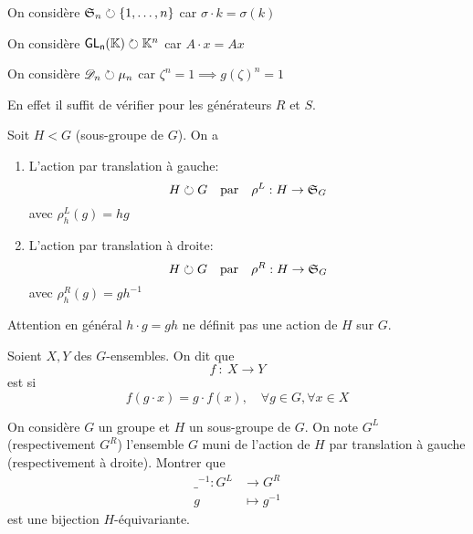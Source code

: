 \begin{example}
    On considère \({\mathfrak{S}}_n \circlearrowright \{1,\ldots,n\}\) car \(\sigma \cdot k = \sigma(k)\)

    On considère \(\operatorname{\mathsf{GL_{n}}}(\mathbb{K}) \circlearrowright \mathbb{K}^n\) car \(A \cdot x = A x\)

    On considère \(\mathscr{D}_n \circlearrowright \mu_n\) car \(\zeta^n=1 \implies g(\zeta)^n=1\)

    En effet il suffit de vérifier pour les générateurs \(R\) et \(S\).

    Soit \(H < G\) (sous-groupe de \(G\)). On a
    \begin{enumerate}
        \item L'action par translation à gauche:
        \begin{equation*}
            H \circlearrowright G \quad\text{par}\quad \rho^L : H \to {\mathfrak{S}}_G
        \end{equation*}
        avec \(\rho^L_h(g) = hg\)

        \item L'action par translation à droite:
        \begin{equation*}
            H \circlearrowright G \quad\text{par}\quad \rho^R : H \to {\mathfrak{S}}_G
        \end{equation*}
        avec \(\rho^R_h(g) = gh^{-1}\)
    \end{enumerate}
    \begin{remark}
        Attention en général \(h\cdot g = gh\) ne définit pas une action de \(H\) sur \(G\).
    \end{remark}
\end{example}



\begin{definition}
    Soient \(X, Y\) des \(G\)-ensembles. On dit que
    \begin{equation*}
        f\ \colon\ X\to Y
    \end{equation*}
    est  si
    \begin{equation*}
        f(g\cdot x) = g\cdot f(x),\quad\forall g\in G,\forall x\in X
    \end{equation*}
\end{definition}

\begin{exo}
    On considère \(G\) un groupe et \(H\) un sous-groupe de \(G\).
    On note \(G^L\) (respectivement \(G^R\)) l'ensemble \(G\) muni de l'action de \(H\)
    par translation à gauche (respectivement à droite). Montrer que
    \begin{equation*}
        \begin{aligned}
            {\_}^{-1} : G^L &\to G^R\\
            g &\mapsto g^{-1}
        \end{aligned}
    \end{equation*}
    est une bijection \(H\)-équivariante.
\end{exo}

